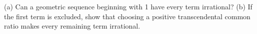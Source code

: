 (a) Can a geometric sequence beginning with 1 have every term irrational? (b) If the first term is excluded, show that choosing a positive transcendental common ratio makes every remaining term irrational.
